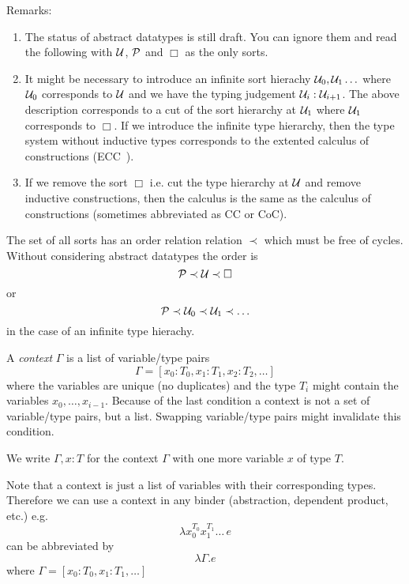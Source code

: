 Remarks:
\begin{enumerate}
\item The status of abstract datatypes is still draft. You can ignore them and
  read the following with ${\cal{U}}$, ${\cal{P}}$ and $\Box$ as the only sorts.

\item It might be necessary to introduce an infinite sort hierachy
  ${\cal{U}}_0, {\cal{U}}_1 \ldots$ where ${\cal{U}}_0$ corresponds to ${\cal{U}}$ and we have the
  typing judgement ${\cal{U}}_i : {\cal{U}}_{i+1}$. The above description corresponds to
  a cut of the sort hierarchy at ${\cal{U}}_1$ where ${\cal{U}}_1$ corresponds to
  $\Box$. If we introduce the infinite type hierarchy, then the type system
  without inductive types corresponds to the extented calculus of
  constructions (ECC~\cite{luo1990}).

\item If we remove the sort $\Box$ i.e. cut the type hierarchy at ${\cal{U}}$ and
  remove inductive constructions, then the calculus is the same as the
  calculus of constructions (sometimes abbreviated as CC or CoC).
\end{enumerate}



The set of all sorts has an order relation relation $\prec$ which must be free
of cycles. Without considering abstract datatypes the order is
$$
{\cal{P}} \prec {\cal{U}} \prec \Box
$$
or
$$
{\cal{P}} \prec {\cal{U}}_0 \prec {\cal{U}}_1 \prec \ldots
$$
in the case of an infinite type hierachy.




\begin{definition}
  A \emph{context} $\Gamma$ is a list of variable/type pairs
  $$
  \Gamma = [x_0: T_0, x_1: T_1, x_2: T_2, \ldots]
  $$
  where the variables are unique (no duplicates) and the type $T_i$ might
  contain the variables $x_0, \ldots, x_{i-1}$. Because of the last condition
  a context is not a set of variable/type pairs, but a list. Swapping
  variable/type pairs might invalidate this condition.

  We write $\Gamma, x:T$ for the context $\Gamma$ with one more variable $x$
  of type $T$.

  Note that a context is just a list of variables with their corresponding
  types. Therefore we can use a context in any binder (abstraction, dependent
  product, etc.) e.g.
  $$
  \lambda x_0^{T_0} x_1^{T_1} \ldots \, e
  $$
  can be abbreviated by
  $$
  \lambda \Gamma . e
  $$
  where $\Gamma = [x_0: T_0, x_1: T_1, \ldots]$
\end{definition}








